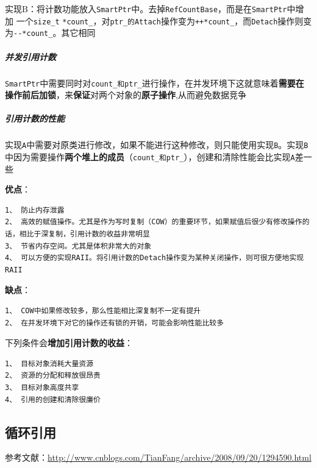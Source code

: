 \documentclass[UTF8,a4paper,12pt]{ctexbook}
\begin{document}
			实现B：将计数功能放入\verb|SmartPtr|中。去掉\verb|RefCountBase|，而是在\verb|SmartPtr|中增加 一个\verb|size_t| \verb|*count_|，对\verb|ptr_的Attach|操作变为\verb|++*count_|，而\verb|Detach|操作则变为\verb|--*count_|。其它相同
			
			\subparagraph{并发引用计数} \verb|SmartPtr|中需要同时对\verb|count_和ptr_|进行操作，在并发环境下这就意味着\textbf{需要在操作前后加锁}，来\textbf{保证}对两个对象的\textbf{原子操作},从而避免数据竞争
			
			\subparagraph{引用计数的性能} 实现\verb|A|中需要对原类进行修改，如果不能进行这种修改，则只能使用实现\verb|B|。实现\verb|B|中因为需要操作\textbf{两个堆上的成员}（\verb|count_和ptr_|），创建和清除性能会比实现\verb|A|差一些
			
			\textbf{优点}：
				\begin{lstlisting}[frame = lbrT]
1、 防止内存泄露
2、 高效的赋值操作。尤其是作为写时复制（COW）的重要环节，如果赋值后很少有修改操作的话，相比于深复制，引用计数的收益非常明显
3、 节省内存空间。尤其是体积非常大的对象
4、 可以方便的实现RAII。将引用计数的Detach操作变为某种关闭操作，则可很方便地实现RAII
				\end{lstlisting}
			
			\textbf{缺点}：
				\begin{lstlisting}[frame = lbrT]
1、 COW中如果修改较多，那么性能相比深复制不一定有提升
2、 在并发环境下对它的操作还有锁的开销，可能会影响性能比较多
				\end{lstlisting}
			
			下列条件会\textbf{增加引用计数的收益}：
				\begin{lstlisting}[frame = lbrT]
1、 目标对象消耗大量资源
2、 资源的分配和释放很昂贵
3、 目标对象高度共享
4、 引用的创建和清除很廉价
				\end{lstlisting}
		\subsection{循环引用}
			参考文献：\url{http://www.cnblogs.com/TianFang/archive/2008/09/20/1294590.html}
		
\end{document}
